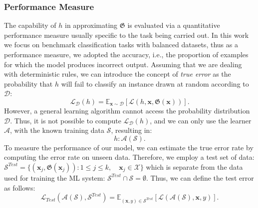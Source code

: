 \subsubsection{Performance Measure}
The capability of $h$ in approximating $\mathfrak{G}$ is evaluated via a quantitative performance measure usually specific to the task being carried out.
In this work %
 we focus on benchmark classification tasks with balanced datasets, thus as a performance measure, we adopted the accuracy, i.e., the proportion of examples for which the model produces incorrect output. %
Assuming that we are dealing with deterministic rules, %
we can introduce the concept of \textit{true error} as the probability that $h$ will fail to classify an instance drawn at random according to $\mathcal{D}$:
\begin{equation}
\mathcal{L}_{\mathcal{D}} (h) = \mathbb{E}_{\bm{x} \sim \mathcal{D}}[\mathcal{L}(h, \bm{x},\mathfrak{G}(\bm{x}))].
\end{equation}
However, a general learning algorithm cannot access the probability distribution $\mathcal{D}$. %
Thus, it is not possible to compute $\mathcal{L}_{\mathcal{D}} (h)$, and we can only use the learner $\mathscr{A}$, with the known training data $\mathcal{S}$, resulting in:
   \begin{equation}
 h : \mathscr{A}(\mathcal{S}).
   \end{equation}
To measure the performance of our model, we can estimate the true error rate by computing the error rate on unseen data. Therefore, we employ a test set of data:
$\mathcal{S}^{Test} = \{(\bm{x}_j,\mathfrak{G}(\bm{x}_j)): 1 \leq j \leq k, \quad \bm{x}_j \in \mathcal{X} \}$ which is separate from the data used for training the ML system: $\mathcal{S}^{Test} \cap \mathcal{S} = \emptyset $.
Thus, we can define the test error as follows:
\begin{equation}
    \mathcal{L}_{Test} (\mathscr{A}(\mathcal{S}), \mathcal{S}^{Test}) = \mathbb{E}_{(\bm{x},y) \in \mathcal{S}^{Test}}[\mathcal{L}(\mathscr{A}(\mathcal{S}), \bm{x},y)].
\end{equation}

